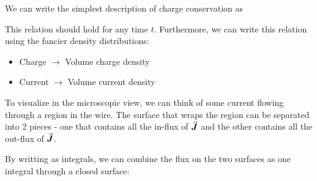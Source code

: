 \documentclass[class=article, crop=false, 12pt]{standalone}
\begin{document}
We can write the simplest description of charge conservation as

This relation should hold for any time $t$. 
Furthermore, we can write this relation using the fancier density distributions:
\begin{itemize}
    \item Charge $\rightarrow$ Volume charge density
    \item Current $\rightarrow$ Volume current density
\end{itemize}

To visualize in the microscopic view, 
we can think of some current flowing through a region in the wire.
The surface that wraps the region can be separated into 2 pieces - 
one that contains all the in-flux of $\va*{J}$ 
and the other contains all the out-flux of $\va*{J}$.


By writting as integrals, we can combine the flux on the two surfaces as one integral through a closed surface:
\end{document}
